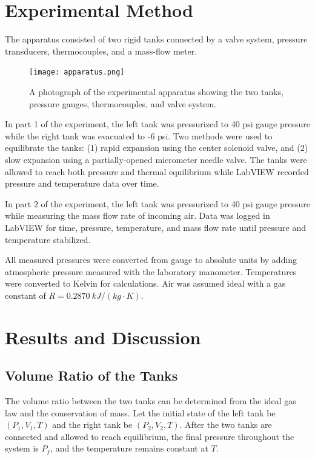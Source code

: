 \documentclass[12pt]{article}
\begin{document}
\section*{Experimental Method}
The apparatus consisted of two rigid tanks connected by a valve system, pressure transducers, thermocouples, and a mass-flow meter.

\begin{figure}[h!]
\centering
\texttt{[image: apparatus.png]}
\caption{A photograph of the experimental apparatus showing the two tanks, pressure gauges, thermocouples, and valve system.}
\label{fig:apparatus}
\end{figure}

In part 1 of the experiment, the left tank was pressurized to 40 psi gauge pressure while the right tank was evacuated to -6 psi.
Two methods were used to equilibrate the tanks:
(1) rapid expansion using the center solenoid valve, and
(2) slow expansion using a partially-opened micrometer needle valve.
The tanks were allowed to reach both pressure and thermal equilibrium while LabVIEW recorded pressure and temperature data over time.

In part 2 of the experiment, the left tank was pressurized to 40 psi gauge pressure while measuring the mass flow rate of incoming air. 
Data was logged in LabVIEW for time, pressure, temperature, and mass flow rate until pressure and temperature stabilized.

All measured pressures were converted from gauge to absolute units by adding atmospheric pressure measured with the laboratory manometer. Temperatures were converted to Kelvin for calculations. Air was assumed ideal with a gas constant of \(R = 0.2870~\si{kJ/(kg\cdot K)}\).

\section*{Results and Discussion}


\subsection*{Volume Ratio of the Tanks}
The volume ratio between the two tanks can be determined from the ideal gas law and the conservation of mass. Let the initial state of the left tank be $(P_1, V_1, T)$ and the right tank be $(P_2, V_2, T)$. After the two tanks are connected and allowed to reach equilibrium, the final pressure throughout the system is $P_f$, and the temperature remains constant at $T$.
\end{document}
